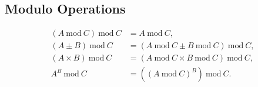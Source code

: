 \subsection{Modulo Operations}
\label{additional:misc:modulo}

\begin{subequations}\label{eq:additional:misc:modulo}
\begin{align}
\left(A~\text{mod}~C\right)~\text{mod}~C &= A~\text{mod}~C, \label{eq:misc:additional:modulo:basic} \\
\left(A \pm B\right)~\text{mod}~C &= \left(A~\text{mod}~C \pm B~\text{mod}~C\right)~\text{mod}~C, \label{eq:misc:additional:modulo:pm} \\
\left(A \times B\right)~\text{mod}~C &= \left(A~\text{mod}~C \times B~\text{mod}~C\right)~\text{mod}~C, \label{eq:misc:additional:modulo:multiplication} \\
A^{B}~\text{mod}~C &= \left(\left(A~\text{mod}~C\right)^{B}\right)~\text{mod}~C. \label{eq:misc:additional:modulo:exp}
\end{align}
\end{subequations}

